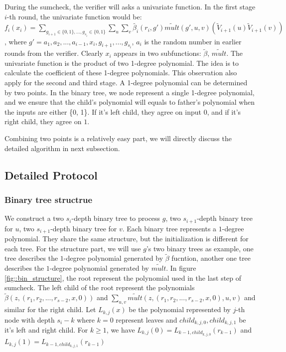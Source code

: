 During the sumcheck, the verifier will asks a univariate function. In the first stage $i$-th round, the univariate function would be: $f_i(x_i)=\sum_{g_{i+1} \in \{0, 1\}, ..., g_{s_{i}} \in \{0, 1\}} \sum_{u} \sum_{v} \tilde{\beta_{i}}(r_i, g')\tilde{mult}(g', u, v)(\tilde{V}_{i+1}(u)\tilde{V}_{i+1}(v))$, where $g' = a_1, a_2, ..., a_{i-1}, x_{i}, g_{i+1}, ..., g_{s_i}$, $a_i$ is the random number in earlier rounds from the verifier. Clearly $x_i$ appears in two subfunctions: $\tilde{\beta}$, $\tilde{mult}$. The univariate function is the product of two 1-degree polynomial. The idea is to calculate the coefficient of these 1-degree polynomials. This observation also apply for the second and third stage. A 1-degree polynomial can be determined by two points. In the binary tree, we node represent a single 1-degree polynomial, and we ensure that the child's polynomial will equals to father's polynomial when the inputs are either \{0, 1\}. If it's left child, they agree on input $0$, and if it's right child, they agree on $1$.

Combining two points is a relatively easy part, we will directly discuss the detailed algorithm in next subsection.

\subsection{Detailed Protocol}
\subsubsection{Binary tree structrue}
We construct a two $s_i$-depth binary tree to process $g$, two $s_{i+1}$-depth binary tree for $u$, two $s_{i+1}$-depth binary tree for $v$. Each binary tree represents a $1$-degree polynomial. They share the same structure, but the initialization is different for each tree. For the structure part, we will use $g$'s two binary trees as example, one tree describes the $1$-degree polynomial generated by $\tilde{\beta}$ fucntion, another one tree describes the $1$-degree polynomial generated by $\tilde{mult}$. In figure \ref{fig::bin_structure}, the root represent the polynomial used in the last step of sumcheck. The left child of the root represent the polynomials $\tilde{\beta}(z, (r_1, r_2, ..., r_{s-2}, x, 0))$ and $\sum_{u, v}\tilde{mult}(z, (r_1, r_2, ..., r_{s-2}, x, 0), u, v)$ and similar for the right child. Let $L_{k, j}(x)$ be the polynomial represented by $j$-th node with depth $s_i - k$ where $k=0$ represent leaves and $child_{k, j, 0}, child_{k, j, 1}$ be it's left and right child. For $k \ge 1$, we have $L_{k, j}(0)=L_{k-1, child_{k, j, 0}}(r_{k-1})$ and $L_{k, j}(1)=L_{k-1, child_{k, j, 1}}(r_{k-1})$

